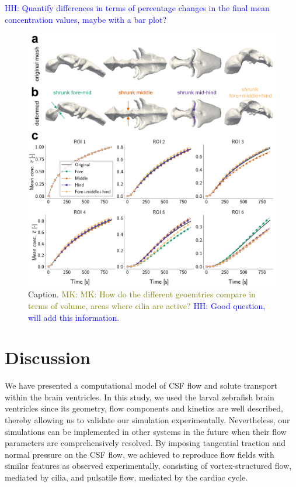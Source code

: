 \documentclass[fleqn]{wlscirep}
\newcommand{\lyng}[1]{\textcolor{blue}{#1}}
\newcommand{\mk}[1]{\textcolor{olive}{MK: #1}}
\begin{document}
\lyng{HH: Quantify differences in terms of percentage changes in the
final mean concentration values, maybe with a bar plot?}
\begin{figure}[H]
    \centering
    \includegraphics[width=\textwidth]{graphics/figure6_compare_modified_geometries.png}
    \caption{Caption. \mk{MK: How do the different geoemtries compare in terms of volume,
    areas where cilia are active?} \lyng{HH: Good question, will add this information.}}
    \label{fig:figure6_sim_results_compare_geometries}
\end{figure}


\section*{Discussion}
We have presented a computational model of CSF flow and solute transport within the brain ventricles.
In this study, we used the larval zebrafish brain ventricles since its geometry,
flow components and kinetics are well described, thereby allowing us to validate
our simulation experimentally. Nevertheless, our simulations can be implemented in
other systems in the future when their flow parameters are comprehensively resolved.  
By imposing tangential traction and normal pressure on the CSF flow, we achieved to reproduce
flow fields with similar features as observed experimentally, consisting of vortex-structured flow,
mediated by cilia, and pulsatile flow, mediated by the cardiac cycle.
\end{document}
